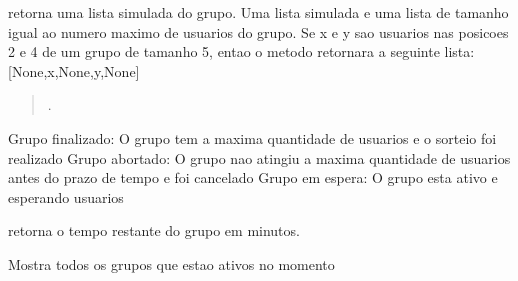 \documentclass[letterpaper,10pt,english]{sphinxmanual}
\begin{document}
\begin{fulllineitems}
\begin{fulllineitems}
\end{fulllineitems}


\begin{fulllineitems}
\label{modules/models:ubet.models.Group.sim_list}
retorna uma lista simulada do grupo.
Uma lista simulada e uma lista de tamanho igual ao numero maximo de usuarios do grupo.
Se x e y sao usuarios nas posicoes 2  e 4 de um grupo de tamanho 5, entao o metodo retornara
a seguinte lista:
{[}None,x,None,y,None{]}
\begin{quote}

.
\end{quote}

\end{fulllineitems}


\begin{fulllineitems}
\label{modules/models:ubet.models.Group.status_list}
Grupo finalizado: O grupo tem a maxima quantidade de usuarios e o sorteio foi realizado
Grupo abortado: O grupo nao atingiu a maxima quantidade de usuarios antes do prazo de tempo e foi
cancelado
Grupo em espera: O grupo esta ativo e esperando usuarios

\end{fulllineitems}


\begin{fulllineitems}
\label{modules/models:ubet.models.Group.time_left}
retorna o tempo restante do grupo em minutos.

\end{fulllineitems}


\begin{fulllineitems}
\label{modules/models:ubet.models.Group.total_active_groups}
Mostra todos os grupos que estao ativos no momento

\end{fulllineitems}


\end{fulllineitems}
\end{document}
